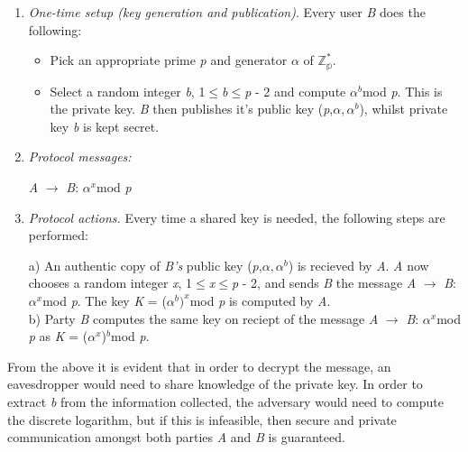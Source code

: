 \documentclass[iwp,first]{luthesis}
\begin{document}
\begin{enumerate}

\item \textit{One-time setup (key generation and publication)}. Every user \textit{B} does the following: 

\begin{itemize}
\item Pick an appropriate prime \textit{p} and generator $\alpha$ of $\mathbb{Z^*_p}$. 
\item Select a random integer \textit{b}, 1$\leq$\textit{b}$\leq$\textit{p }- 2 and compute \textit{$\alpha^b$}mod \textit{p}. This is the private key. \textit{B} then publishes it's public key (\textit{p},$\alpha,\alpha^b$), whilst private key \textit{b} is kept secret. 
\end{itemize}

\item \textit{Protocol messages:}

\begin{center}
\textit{A} $\longrightarrow$ \textit{B}: $\alpha^x$mod \textit{p} 
\end{center}

\item \textit{Protocol actions.} Every time a shared key is needed, the following steps are performed:

a) An authentic copy of \textit{B's} public key (\textit{p},$\alpha,\alpha^b$) is recieved by \textit{A}. \textit{A} now chooses a random integer \textit{x}, 1$\leq$\textit{x}$\leq$\textit{p} - 2, and sends \textit{B} the message \textit{A} $\longrightarrow$ \textit{B}: $\alpha^x$mod \textit{p}. The key \textit{K} = ($\alpha^b)^x$mod \textit{p} is computed by \textit{A}.
\\
b) Party \textit{B} computes the same key on reciept of the message \textit{A} $\longrightarrow$ \textit{B}: $\alpha^x$mod \textit{p} as \textit{K} = (\textit{$\alpha^x$})$^b$mod \textit{p}.

\end{enumerate}

From the above it is evident that in order to decrypt the message, an eavesdropper would need to share knowledge of the private key. In order to extract \textit{b} from the information collected, the adversary would need to compute the discrete logarithm, but if this is infeasible, then secure and private communication amongst both parties \textit{A} and \textit{B} is guaranteed. 
\end{document}
